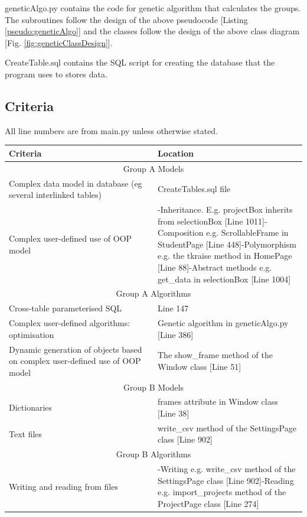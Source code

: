 \documentclass{article}
\begin{document}
\vspace{5mm}\noindent
geneticAlgo.py contains the code for genetic algorithm that calculates the groups. The subroutines follow the design of the above pseudocode [Listing \ref{pseudo:geneticAlgo}] and the classes follow the design of the above class diagram [Fig. \ref{fig:geneticClassDesign}].

\vspace{5mm}\noindent
CreateTable.sql contains the SQL script for creating the database that the program uses to stores data.

\subsection*{Criteria}
All line numbers are from main.py unless otherwise stated.
\begin{longtable}[c]{|m{0.5\linewidth}|m{0.5\linewidth}|}
    \hline
    Criteria&Location\\
    \hline
    \multicolumn{2}{|c|}{Group A Models}\\
    \hline
    Complex data model in database (eg several interlinked tables)&CreateTables.sql file\\
    \hline
    Complex user-defined use of OOP model&-Inheritance. E.g. projectBox inherits from selectionBox [Line 1011]\newline-Composition e.g. ScrollableFrame in StudentPage [Line 448]\newline-Polymorphism e.g. the tkraise method in HomePage [Line 88]\newline-Abstract methods e.g. get\_data in selectionBox [Line 1004]\\
    \hline
    \multicolumn{2}{|c|}{Group A Algorithms}\\
    \hline
    Cross-table parameterised SQL&Line 147\\
    \hline
    Complex user-defined algorithms: optimisation&Genetic algorithm in geneticAlgo.py [Line 386]\\
    \hline
    Dynamic generation of objects based on complex user-defined use of OOP model&The show\_frame method of the Window class [Line 51]\\
    \hline
    \multicolumn{2}{|c|}{Group B Models}\\
    \hline
    Dictionaries&frames attribute in Window class [Line 38]\\
    \hline
    Text files&write\_csv method of the SettingsPage class [Line 902]\\
    \hline
    \multicolumn{2}{|c|}{Group B Algorithms}\\
    \hline
    Writing and reading from files&-Writing e.g. write\_csv method of the SettingsPage class [Line 902]\newline-Reading e.g. import\_projects method of the ProjectPage class [Line 274]\\
    \hline
    



\end{longtable}
\end{document}
